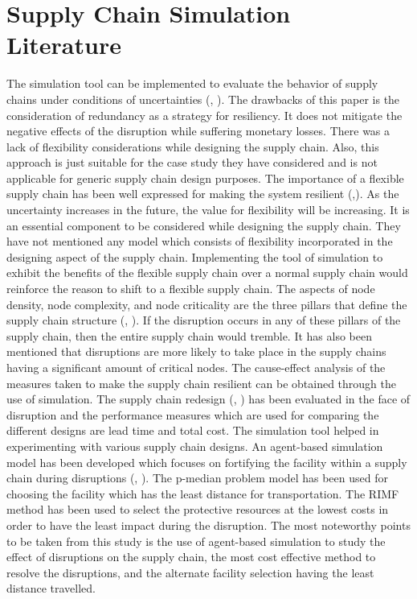 \section{Supply Chain Simulation Literature}
 The simulation tool can be implemented to evaluate the behavior of supply chains under conditions of uncertainties (\citeauthor{carvalho2012supply}, \citeyear{carvalho2012supply}). The drawbacks of this paper is the consideration of redundancy as a strategy for resiliency. It does not mitigate the negative effects of the disruption while suffering monetary losses. There was a lack of flexibility considerations while designing the supply chain. Also, this approach is just suitable for the case study they have considered and is not applicable for generic supply chain design purposes. The importance of a flexible supply chain has been well expressed for making the system resilient (\citeauthor{christopher2011supply},\citeyear{christopher2011supply}). As the uncertainty increases in the future, the value for flexibility will be increasing. It is an essential component to be considered while designing the supply chain. They have not mentioned any model which consists of flexibility incorporated in the designing aspect of the supply chain. Implementing the tool of simulation to exhibit the benefits of the flexible supply chain over a normal supply chain would reinforce the reason to shift to a flexible supply chain. The aspects of node density, node complexity, and node criticality are the three pillars that define the supply chain structure (\citeauthor{Falasca2008}, \citeyear{Falasca2008}). If the disruption occurs in any of these pillars of the supply chain, then the entire supply chain would tremble. It has also been mentioned that disruptions are more likely to take place in the supply chains having a significant amount of critical nodes. The cause-effect analysis of the measures taken to make the supply chain resilient can be obtained through the use of simulation. The supply chain redesign (\citeauthor{carvalho2012supply}, \citeyear{carvalho2012supply}) has been evaluated in the face of disruption and the performance measures which are used for comparing the different designs are lead time and total cost. The simulation tool helped in experimenting with various supply chain designs.
 An agent-based simulation model has been developed which focuses on fortifying the facility within a supply chain during disruptions (\citeauthor{Li2018}, \citeyear{Li2018}). The p-median problem model has been used for choosing the facility which has the least distance for transportation. The RIMF method has been used to select the protective resources at the lowest costs in order to have the least impact during the disruption. The most noteworthy points to be taken from this study is the use of agent-based simulation to study the effect of disruptions on the supply chain, the most cost effective method to resolve the disruptions, and the alternate facility selection having the least distance travelled.

